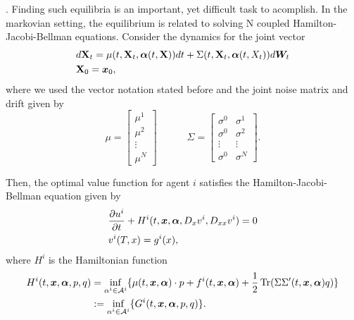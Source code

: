 . Finding such equilibria is an important, yet difficult task to acomplish. In the markovian setting, the equilibrium is related to solving N coupled Hamilton-Jacobi-Bellman equations. Consider the dynamics for the joint vector 
\begin{equation}
	\label{eqn:X_dynamics}
	\begin{split}
&d\mathbf{X}_t=\mu(t,\mathbf{X}_t,\bm{\alpha}(t,\mathbf{X}))dt+\Sigma(t,\mathbf{X}_t,\bm{\alpha}(t,X_t))d\bm{W}_t\\
&\mathbf{X}_0=\bm{x}_0,
	\end{split}
\end{equation}
where we used the vector notation stated before and the joint noise matrix and drift given by
\begin{equation}
	\mu=\begin{bmatrix}
		\mu^1 \\
		\mu^2 \\
		\vdots   \\
		\mu^N
	\end{bmatrix}
	\quad\quad\quad
	\Sigma=\begin{bmatrix}
		\sigma^0 & \sigma^1\\
		\sigma^0 & \sigma^2\\
		\vdots   &  \vdots\\
		\sigma^0 & \sigma^N
	\end{bmatrix}.
\end{equation}

Then, the optimal value function for agent $i$ satisfies the Hamilton-Jacobi-Bellman equation given by
\begin{equation}
	\begin{split}
	&\frac{\partial u^i}{\partial t}+H^i(t,\bm{x},\bm{\alpha},D_x v^i,D_{xx} v^i)=0\\
	&v^i(T,x)=g^i(x),
	\end{split}
\end{equation}
where $H^i$ is the Hamiltonian function 
\begin{equation}
	\label{eqn:Hamiltonian}
	\begin{split}
		H^i(t,\bm{x},\bm{\alpha},p,q)&=\inf_{\alpha^i\in \mathcal{A}^i}\{\mu(t,\bm{x},\bm{\alpha})\cdot p+f^i(t,\bm{x},\bm{\alpha})+\frac{1}{2}\operatorname{Tr}(\Sigma\Sigma'(t,\bm{x},\bm{\alpha}) q)\}\\
		&:=\inf_{\alpha^i\in \mathcal{A}^i}\{G^i(t,\bm{x},\bm{\alpha},p,q)\}.
	\end{split}
\end{equation}


